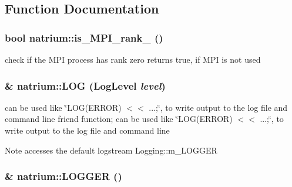 \subsection{Function Documentation}
\hypertarget{namespacenatrium_a791202a0d8b6bdac2c62f3ae63905a36}{
\subsubsection[{is\_\-MPI\_\-rank\_\-0}]{\setlength{\rightskip}{0pt plus 5cm}bool natrium::is\_\-MPI\_\-rank\_ ()}}
\label{namespacenatrium_a791202a0d8b6bdac2c62f3ae63905a36}
check if the MPI process has rank zero returns true, if MPI is not used \hypertarget{namespacenatrium_ad2838e1bab766ae66a68aa1ac6f2f7cb}{
\subsubsection[{LOG}]{ \& natrium::LOG (LogLevel {\em level})}}
\label{namespacenatrium_ad2838e1bab766ae66a68aa1ac6f2f7cb}


can be used like \char`\"{}LOG(ERROR) $<$$<$ ...;\char`\"{}, to write output to the log file and command line friend function; can be used like \char`\"{}LOG(ERROR) $<$$<$ ...;\char`\"{}, to write output to the log file and command line

\begin{DoxyNote}{Note}
accesses the default logstream Logging::m\_\-LOGGER 
\end{DoxyNote}
\hypertarget{namespacenatrium_addbc7112675b740db86c1c775fce7b1d}{
\subsubsection[{LOGGER}]{ \& natrium::LOGGER ()}}
\label{namespacenatrium_addbc7112675b740db86c1c775fce7b1d}


